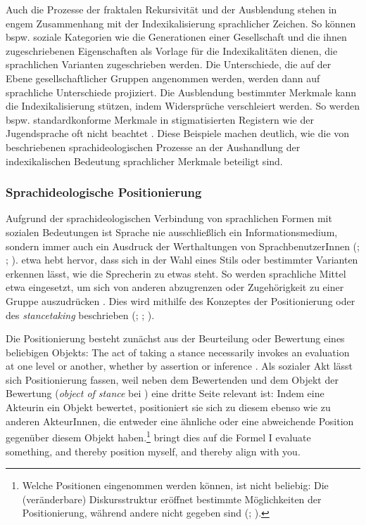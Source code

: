 Auch die Prozesse der fraktalen Rekursivität und der Ausblendung stehen in engem Zusammenhang mit der Indexikalisierung sprachlicher Zeichen. 
So können bspw. soziale Kategorien wie die Generationen einer Gesellschaft und die ihnen zugeschriebenen Eigenschaften als Vorlage für die Indexikalitäten dienen, die sprachlichen Varianten zugeschrieben werden. 
Die Unterschiede, die auf der Ebene gesellschaftlicher Gruppen angenommen werden, werden dann auf sprachliche Unterschiede projiziert. 
Die Ausblendung bestimmter Merkmale kann die Indexikalisierung stützen, indem Widersprüche verschleiert werden. 
So werden bspw. standardkonforme Merkmale in stigmatisierten Registern wie der Jugendsprache oft nicht beachtet \citep[s.][143]{Hundt.2017b}. 
Diese Beispiele machen deutlich, wie die von \citet{Irvine2000} beschriebenen sprachideologischen Prozesse an der Aushandlung der indexikalischen Bedeutung sprachlicher Merkmale beteiligt sind. 
\subsubsection{Sprachideologische Positionierung}
\label{sec:Positionierung}
Aufgrund der sprachideologischen Verbindung von sprachlichen Formen mit sozialen Bedeutungen ist Sprache nie ausschließlich ein Informationsmedium, sondern immer auch ein Ausdruck der Werthaltungen von SprachbenutzerInnen (\citealp[s.][491]{HessLuttich2005}; \citealp[95]{Bell.2007}; \citealp[195]{Spitzmuller.2007}). 
\citet[40]{Agha2005} etwa hebt hervor, dass sich in der Wahl eines Stils oder bestimmter Varianten erkennen lässt, wie die Sprecherin zu etwas steht. 
So werden sprachliche Mittel etwa eingesetzt, um sich von anderen abzugrenzen oder Zugehörigkeit zu einer Gruppe auszudrücken \citep[s.][17]{Silverstein.1976}.
Dies wird mithilfe des Konzeptes der Positionierung oder des \textit{stancetaking} beschrieben (\citealp[s.][]{DuBois.2007}; \citealp[]{Jaffe.2016}; \citealp{Spitzmuller.2017b}). 

Die Positionierung besteht zunächst aus der Beurteilung oder Bewertung eines beliebigen Objekts:
\glqq The act of taking a stance necessarily invokes an evaluation at one level or another, whether by assertion or inference\grqq{} \citep[141]{DuBois.2007}.
Als sozialer Akt lässt sich Positionierung fassen, weil neben dem Bewertenden und dem Objekt der Bewertung (\textit{object of stance} bei \citeauthor{DuBois.2007}) eine dritte Seite relevant ist:
Indem eine Akteurin ein Objekt bewertet, positioniert sie sich zu diesem ebenso wie zu anderen AkteurInnen, die entweder eine ähnliche oder eine abweichende Position gegenüber diesem Objekt haben.\footnote{Welche Positionen eingenommen werden können, ist nicht beliebig: Die (veränderbare) {Dis\-kurs\-struk\-tur} eröffnet bestimmte Möglichkeiten der Positionierung, während andere nicht gegeben sind (\citealp[s.][82]{Foucault.1981}; \citealp[4]{Spitzmuller.2017b}).}
\citet[163]{DuBois.2007} bringt dies auf die Formel {\glqq}I evaluate something, and thereby position myself, and thereby align with you{\grqq}.

